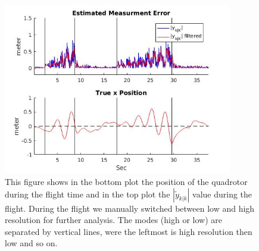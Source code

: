 \documentclass[ twoside, 12pt ]{article}
\begin{document}
\begin{figure} %
    \centerline{\includegraphics[width=100mm]{errorVsPosition.jpg}}
    \caption{This figure shows in the bottom plot the position of the quadrotor during the flight time and in the top plot the $\left| \tilde{y}_{k|k} \right|$ value during the flight. During the flight we manually switched between low and high resolution for further analysis. The modes (high or low) are separated by vertical lines, were the leftmost is high resolution then low and so on.}
    \label{fig:testPlot}
\end{figure}
\end{document}
